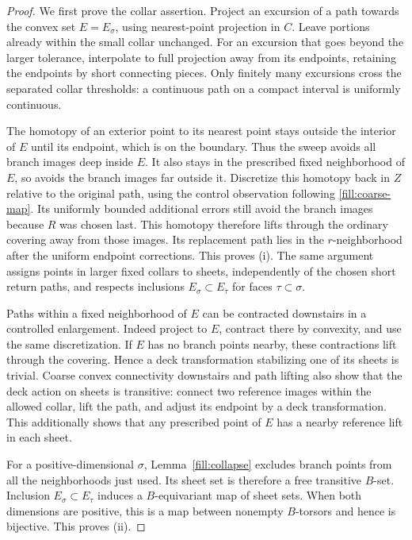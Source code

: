 \begin{proof}
We first prove the collar assertion.  Project an excursion of a path
towards the convex set \(E=E_\sigma\), using nearest-point projection in
\(C\).  Leave portions already within the small collar unchanged.
For an excursion that goes beyond the larger tolerance, interpolate to
full projection away from its endpoints, retaining the endpoints by
short connecting pieces.  Only finitely many excursions cross the
separated collar thresholds: a continuous path on a compact interval
is uniformly continuous.

The homotopy of an exterior point to its nearest point stays outside
the interior of \(E\) until its endpoint, which is on the boundary.
Thus the sweep avoids all branch images deep inside \(E\).
It also stays in the prescribed fixed neighborhood of \(E\), so avoids
the branch images far outside it.  Discretize this homotopy back in \(Z\)
relative to the original path, using the control observation following
\eqref{fill:coarse-map}.  Its uniformly bounded additional errors still
avoid the branch images because \(R\) was chosen last.
This homotopy therefore lifts through the ordinary covering away from
those images.  Its replacement path lies in the \(r\)-neighborhood
after the uniform endpoint corrections.  This proves (i).  The same
argument assigns points in larger fixed collars to sheets, independently
of the chosen short return paths, and respects inclusions
\(E_\sigma\subset E_\tau\) for faces \(\tau\subset\sigma\).

Paths within a fixed neighborhood of \(E\) can be contracted downstairs
in a controlled enlargement.  Indeed project to \(E\), contract there
by convexity, and use the same discretization.  If \(E\) has no branch
points nearby, these contractions lift through the covering.  Hence a
deck transformation stabilizing one of its sheets is trivial.
Coarse convex connectivity downstairs and path lifting also show that
the deck action on sheets is transitive: connect two reference images
within the allowed collar, lift the path, and adjust its endpoint by a
deck transformation.  This additionally shows that any prescribed point
of \(E\) has a nearby reference lift in each sheet.

For a positive-dimensional \(\sigma\), Lemma~\ref{fill:collapse} excludes
branch points from all the neighborhoods just used.  Its sheet set is
therefore a free transitive \(B\)-set.  Inclusion
\(E_\sigma\subset E_\tau\) induces a \(B\)-equivariant map of sheet sets.
When both dimensions are positive, this is a map between nonempty
\(B\)-torsors and hence is bijective.  This proves (ii).


\end{proof}
